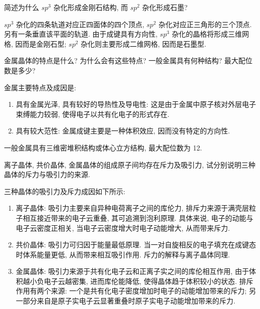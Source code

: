\documentclass[UTF8]{ctexart}
\newenvironment{Answer}{}{}
\begin{document}
\begin{Question}
            \item 简述为什么 $sp^{3}$ 杂化形成金刚石结构, 而 $sp^{2}$ 杂化形成石墨?

\begin{Answer}
    \begin{Solve}[Answer:]
        \hspace*{2em}$sp^3$ 杂化的四条轨道对应正四面体的四个顶点, $sp^2$ 杂化对应正三角形的三个顶点. 另有一条垂直该平面的轨道. 由于成键具有方向性, $sp^3$ 杂化的晶格将形成三维网格, 因而是金刚石型; $sp^2$ 杂化则主要形成二维网格, 因而是石墨型.
    \end{Solve}
\end{Answer}

            \item 金属晶体的特点是什么? 为什么会有这些特点? 一般金属具有何种结构? 最大配位数是多少?

\begin{Answer}
    \begin{Solve}[Answer:]
        \hspace*{2em}金属主要特点及成因是:
            \begin{enumerate}
                \item 具有金属光泽, 具有较好的导热性及导电性: 这是由于金属中原子核对外层电子束缚能力较弱, 使得电子以共有化电子的形式存在.
                \item 具有较大范性: 金属成键主要是一种体积效应, 因而没有特定的方向性.
            \end{enumerate}

        \hspace*{2em}一般金属具有三维密堆积结构或体心立方结构, 最大配位数为 12.
    \end{Solve}
\end{Answer}

            \item 离子晶体, 共价晶体, 金属晶体的组成原子间均存在斥力及吸引力, 试分别说明三种晶体的斥力与吸引力的来源.

\begin{Answer}
    \begin{Solve}[Answer:]
        \hspace*{2em}三种晶体的吸引力及斥力成因如下所示:
            \begin{enumerate}
                \item 离子晶体: 吸引力主要来自异种电荷离子之间的库伦力, 排斥力来源于满壳层粒子相互接近带来的电子云重叠, 其可追溯到泡利原理. 具体来说, 电子的动能与电子云密度正相关, 当电子云密度增大时电子动能增大, 从而带来斥力.
                \item 共价晶体: 吸引力可归因于能量最低原理. 当一对自旋相反的电子填充在成键态时体系能量更低, 从而带来相互吸引作用. 斥力的解释与离子晶体同理.
                \item 金属晶体: 吸引力来源于共有化电子云和正离子实之间的库伦相互作用, 由于体积越小负电子云越密集, 进而库伦能降低, 使得晶体趋于体积较小的状态. 排斥作用有两个来源: 一个是共有化电子密度增加时电子的动能增加带来的斥力; 另一部分来自是原子实电子云显著重叠时原子实电子动能增加带来的斥力.
            \end{enumerate}
    \end{Solve}
\end{Answer}


\end{Question}
\end{document}
